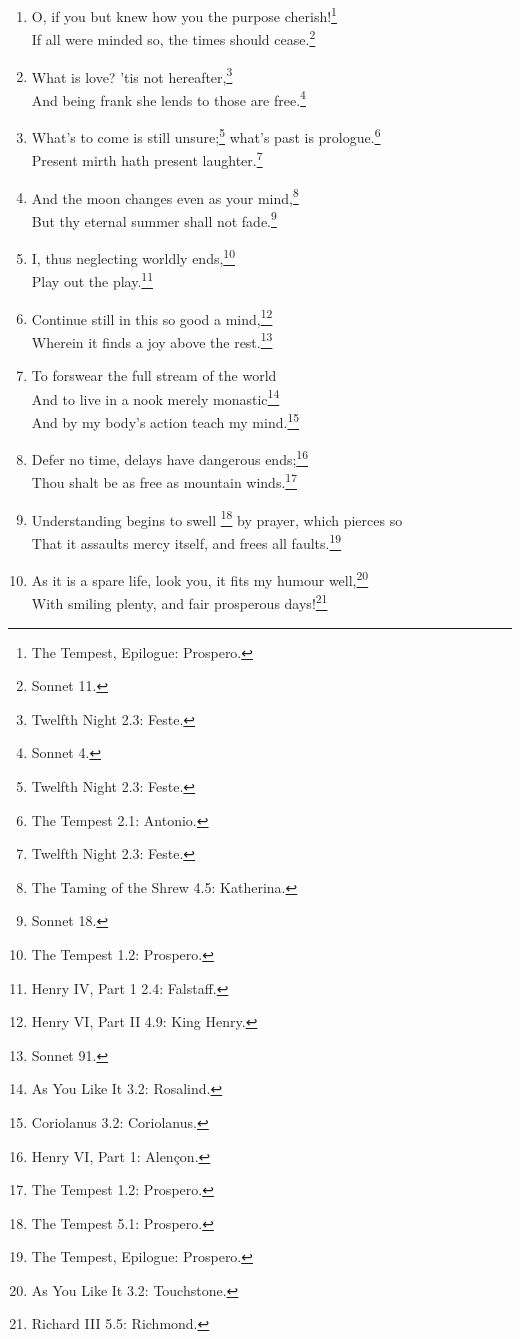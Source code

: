 \documentclass[17pt,twoside]{extarticle}
\begin{document}
\begin{enumerate}
{    Night 2.4: Orsino.}
\item
  O, if you but knew how you the purpose cherish!\footnote{The Tempest,
    Epilogue: Prospero.}\\If all were minded so, the times should
  cease.\footnote{Sonnet 11.}
\item
  What is love? 'tis not hereafter,\footnote{Twelfth Night 2.3: Feste.}\\And
  being frank she lends to those are free.\footnote{Sonnet 4.}
\item
  What's to come is still unsure;\footnote{Twelfth Night 2.3: Feste.}
  what's past is prologue.\footnote{The Tempest 2.1: Antonio.}\\Present
  mirth hath present laughter.\footnote{Twelfth Night 2.3: Feste.}
\item
  And the moon changes even as your mind,\footnote{The Taming of the
    Shrew 4.5: Katherina.}\\But thy eternal summer shall not
  fade.\footnote{Sonnet 18.}
\item
  I, thus neglecting worldly ends,\footnote{The Tempest 1.2: Prospero.}\\Play
  out the play.\footnote{Henry IV, Part 1 2.4: Falstaff.}
\item
  Continue still in this so good a mind,\footnote{Henry VI, Part II 4.9:
    King Henry.}\\Wherein it finds a joy above the rest.\footnote{Sonnet
    91.}
\item
  To forswear the full stream of the world\\And to live in a nook merely
  monastic\footnote{As You Like It 3.2: Rosalind.}\\And by my body's
  action teach my mind.\footnote{Coriolanus 3.2: Coriolanus.}
\item
  Defer no time, delays have dangerous ends;\footnote{Henry VI, Part 1:
    Alençon.}\\Thou shalt be as free as mountain winds.\footnote{The
    Tempest 1.2: Prospero.}
\item
  Understanding begins to swell \footnote{The Tempest 5.1: Prospero.} by
  prayer, which pierces so\\That it assaults mercy itself, and frees all
  faults.\footnote{The Tempest, Epilogue: Prospero.}
\item
  As it is a spare life, look you, it fits my humour well,\footnote{As
    You Like It 3.2: Touchstone.}\\With smiling plenty, and fair
  prosperous days!\footnote{Richard III 5.5: Richmond.}

\end{enumerate}
\end{document}
